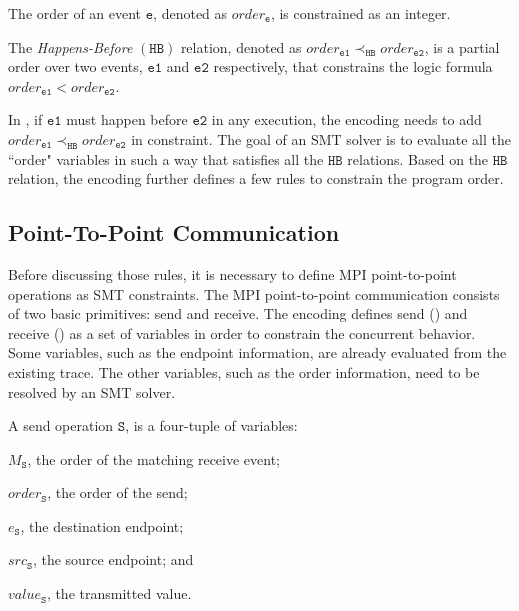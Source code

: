 \begin{definition}[Order]\label{def:order}
The order of an event $\mathtt{e}$, denoted as $\mathit{order}_\mathtt{e}$, is constrained as an integer.
\end{definition}

\begin{definition}\label{def:happens-before}
The \emph{Happens-Before} $(\mathtt{HB})$ relation, denoted as
$\mathit{order}_\mathtt{e1} \mathrm{\prec_\mathtt{HB}} \mathit{order}_\mathtt{e2}$, is a partial order over two events, $\mathtt{e1}$ and $\mathtt{e2}$ respectively, that constrains the logic formula $\mathit{order}_\mathtt{e1} <  \mathit{order}_\mathtt{e2}$. 
\label{def:hb}
\end{definition}

In , if $\mathtt{e1}$ must happen before $\mathtt{e2}$ in any execution, the encoding needs to add $\mathit{order}_\mathtt{e1} \mathrm{\prec_\mathtt{HB}} \mathit{order}_\mathtt{e2}$ in constraint. The goal of an SMT solver is to evaluate all the ``order" variables in such a way that satisfies all the $\mathtt{HB}$ relations. Based on the $\mathtt{HB}$ relation, the encoding further defines a few rules to constrain the program order. 

\subsection{Point-To-Point Communication}
Before discussing those rules, it is necessary to define MPI point-to-point operations as SMT constraints. The MPI point-to-point communication consists of two basic  primitives: send and receive. The encoding defines send () and receive () as a set of variables in order to constrain the concurrent behavior. Some variables, such as the endpoint information, are already evaluated from the existing trace. The other variables, such as the order information, need to be resolved by an SMT solver. 
 
\begin{definition}[Send] \label{def:snd}
A send operation $\mathtt{S}$, is a four-tuple of variables:
\begin{compactenum}
\item $M_\mathtt{S}$, the order of the matching receive event;
\item $\mathit{order}_\mathtt{S}$, the order of the send;
\item $e_\mathtt{S}$, the destination endpoint; 
\item $src_\mathtt{S}$, the source endpoint; and
\item $\mathit{value}_\mathtt{S}$, the transmitted value.
\end{compactenum}
\end{definition}

